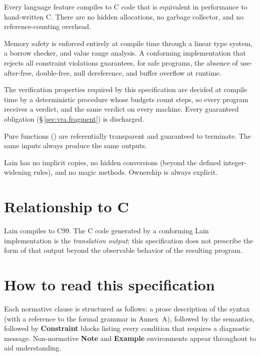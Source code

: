 \begin{description}[leftmargin=2em]
  \item[P1 --- Assembly-Speed Performance]
    Every language feature compiles to C code that is equivalent in
    performance to hand-written C.  There are no hidden allocations, no
    garbage collector, and no reference-counting overhead.

  \item[P2 --- Zero-Cost Memory Safety]
    Memory safety is enforced entirely at compile time through a linear type
    system, a borrow checker, and value range analysis.  A conforming
    implementation that rejects all constraint violations guarantees, for
    safe programs, the absence of use-after-free, double-free, null
    dereference, and buffer overflow at runtime.

  \item[P3 --- Static Verification]
    The verification properties required by this specification are decided at
    compile time by a deterministic procedure whose budgets count steps, so
    every program receives a verdict, and the same verdict on every machine.
    Every guaranteed obligation (\S\,\ref{sec:vra.fragment}) is discharged.

  \item[P4 --- Determinism]
    Pure functions () are referentially transparent and
    guaranteed to terminate.  The same inputs always produce the same
    outputs.

  \item[P5 --- Syntactic Simplicity]
    Lain has no implicit copies, no hidden conversions (beyond the defined
    integer-widening rules), and no magic methods.  Ownership is always
    explicit.
\end{description}

\section*{Relationship to C}

Lain compiles to C99.  The C code generated by a conforming Lain
implementation is the \emph{translation output}; this specification does not
prescribe the form of that output beyond the observable behavior of the
resulting program.

\section*{How to read this specification}

Each normative clause is structured as follows: a prose description of the
syntax (with a reference to the formal grammar in Annex~A), followed by the
semantics, followed by \textbf{Constraint} blocks listing every condition
that requires a diagnostic message.  Non-normative \textbf{Note} and
\textbf{Example} environments appear throughout to aid understanding.
